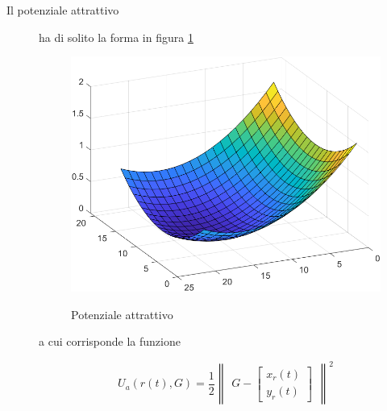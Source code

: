 \documentclass[14pt,twoside,a4paper]{extarticle}
\begin{document}
\begin{description}
\item[Il potenziale attrattivo] ha di solito la forma in figura \ref{potA}
\begin{figure}[H]
\caption{Potenziale attrattivo}
\includegraphics[width=\textwidth]{potA.png}
\label{potA}
\end{figure}
a cui corrisponde la funzione 

\begin{equation}
U_a(r(t),G) = \frac{1}{2} \begin{Vmatrix}G - \begin{bmatrix} x_r(t)\\ y_r(t) \end{bmatrix}\end{Vmatrix}^2
\end{equation}


\end{description}
\end{document}

